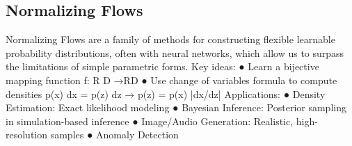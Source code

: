 \subsection{Normalizing Flows}

Normalizing Flows are a family of methods for constructing flexible learnable probability distributions,
often with neural networks, which allow us to surpass the limitations of simple parametric forms.
Key ideas:
● Learn a bijective mapping function f: R D
→RD
● Use change of variables formula to compute densities p(x) dx = p(z) dz → p(z) = p(x) |dx/dz|
Applications:
● Density Estimation: Exact likelihood modeling
● Bayesian Inference: Posterior sampling in simulation-based inference
● Image/Audio Generation: Realistic, high-resolution samples
● Anomaly Detection